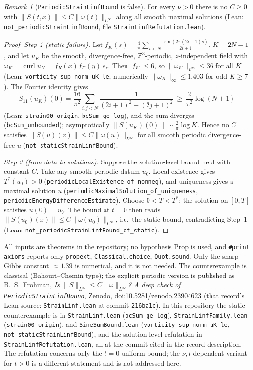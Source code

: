 \documentclass[11pt]{article}
\theoremstyle{definition}
\theoremstyle{remark}
\newtheorem{remark}{Remark}
\begin{document}
\begin{remark}[\texttt{PeriodicStrainLinfBound} is false]\label{rem:refuted}
For every $\nu>0$ there is no $C\ge0$ with $\|S(t,x)\|\le C\|\omega(t)\|_{L^\infty}$ along all smooth maximal solutions (Lean: \texttt{not\_periodicStrainLinfBound}, file \texttt{StrainLinfRefutation.lean}).
\end{remark}
\begin{proof}
\emph{Step 1 (static failure).} Let $f_K(s)=\frac4\pi\sum_{i<N}\frac{\sin(2\pi(2i+1)s)}{2i+1}$, $K=2N-1$, and let $u_K$ be the smooth, divergence-free, $\mathbb Z^3$-periodic, $z$-independent field with $\omega_K=\operatorname{curl}u_K=f_K(x)f_K(y)\,e_z$. Then $|f_K|\le 6$, so $\|\omega_K\|_{L^\infty}\le36$ for all $K$ (Lean: \texttt{vorticity\_sup\_norm\_uK\_le}; numerically $\|\omega_K\|_\infty\le1.403$ for odd $K\ge7$). The Fourier identity gives
\[
S_{11}(u_K)(0)=\frac{16}{\pi^2}\sum_{i,j<N}\frac{1}{(2i+1)^2+(2j+1)^2}\ \ge\ \frac{2}{\pi^2}\log(N+1)
\]
(Lean: \texttt{strain00\_origin}, \texttt{bcSum\_ge\_log}), and the sum diverges (\texttt{bcSum\_unbounded}); asymptotically $\|S(u_K)(0)\|\sim\frac2\pi\log K$. Hence no $C$ satisfies $\|S(u)(x)\|\le C\|\omega(u)\|_{L^\infty}$ for all smooth periodic divergence-free $u$ (\texttt{not\_staticStrainLinfBound}).

\emph{Step 2 (from data to solutions).} Suppose the solution-level bound held with constant $C$. Take any smooth periodic datum $u_0$. Local existence gives $T^*(u_0)>0$ (\texttt{periodicLocalExistence\_of\_nonneg}), and uniqueness gives a maximal solution $u$ (\texttt{periodicMaximalSolution\_of\_uniqueness}, \texttt{periodicEnergyDifferenceEstimate}). Choose $0<T<T^*$; the solution on $[0,T]$ satisfies $u(0)=u_0$. The bound at $t=0$ then reads $\|S(u_0)(x)\|\le C\|\omega(u_0)\|_{L^\infty}$, i.e.\ the static bound, contradicting Step~1 (Lean: \texttt{not\_periodicStrainLinfBound\_of\_static}).
\end{proof}
All inputs are theorems in the repository; no hypothesis Prop is used, and \texttt{\#print axioms} reports only \texttt{propext}, \texttt{Classical.choice}, \texttt{Quot.sound}. Only the sharp Gibbs constant $\approx1.39$ is numerical, and it is not needed. The counterexample is classical (Bahouri--Chemin type); the explicit periodic version is published as B.~S.~Frohman, \emph{Is $\|S\|_{L^\infty}\le C\|\omega\|_{L^\infty}$? A deep check of \texttt{PeriodicStrainLinfBound}}, Zenodo, doi:10.5281/zenodo.23904623 (that record's Lean source: \texttt{StrainLinf.lean} at commit \texttt{216ba1c}). In this repository the static counterexample is in \texttt{StrainLinf.lean} (\texttt{bcSum\_ge\_log}), \texttt{StrainLinfFamily.lean} (\texttt{strain00\_origin}), and \texttt{SineSumBound.lean} (\texttt{vorticity\_sup\_norm\_uK\_le}, \texttt{not\_staticStrainLinfBound}), and the solution-level refutation in \texttt{StrainLinfRefutation.lean}, all at the commit cited in the record description. The refutation concerns only the $t=0$ uniform bound; the $\nu,t$-dependent variant for $t>0$ is a different statement and is not addressed here.
\end{document}
